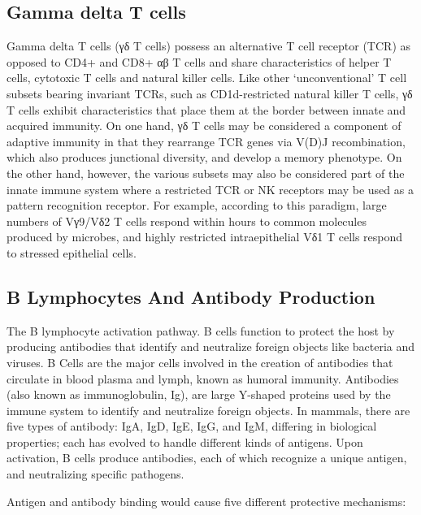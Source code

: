 \hypertarget{gamma-delta-t-cells}{%
\subsection{Gamma delta T cells}\label{gamma-delta-t-cells}}

Gamma delta T cells (γδ T cells) possess an alternative T cell receptor (TCR) as opposed to CD4+ and CD8+ αβ T cells and share characteristics of helper T cells, cytotoxic T cells and natural killer cells. Like other `unconventional' T cell subsets bearing invariant TCRs, such as CD1d-restricted natural killer T cells, γδ T cells exhibit characteristics that place them at the border between innate and acquired immunity. On one hand, γδ T cells may be considered a component of adaptive immunity in that they rearrange TCR genes via V(D)J recombination, which also produces junctional diversity, and develop a memory phenotype. On the other hand, however, the various subsets may also be considered part of the innate immune system where a restricted TCR or NK receptors may be used as a pattern recognition receptor. For example, according to this paradigm, large numbers of Vγ9/Vδ2 T cells respond within hours to common molecules produced by microbes, and highly restricted intraepithelial Vδ1 T cells respond to stressed epithelial cells.

\hypertarget{b-lymphocytes-and-antibody-production}{%
\subsection{B Lymphocytes And Antibody Production}\label{b-lymphocytes-and-antibody-production}}

The B lymphocyte activation pathway. B cells function to protect the host by producing antibodies that identify and neutralize foreign objects like bacteria and viruses.
B Cells are the major cells involved in the creation of antibodies that circulate in blood plasma and lymph, known as humoral immunity. Antibodies (also known as immunoglobulin, Ig), are large Y-shaped proteins used by the immune system to identify and neutralize foreign objects. In mammals, there are five types of antibody: IgA, IgD, IgE, IgG, and IgM, differing in biological properties; each has evolved to handle different kinds of antigens. Upon activation, B cells produce antibodies, each of which recognize a unique antigen, and neutralizing specific pathogens.

Antigen and antibody binding would cause five different protective mechanisms:

